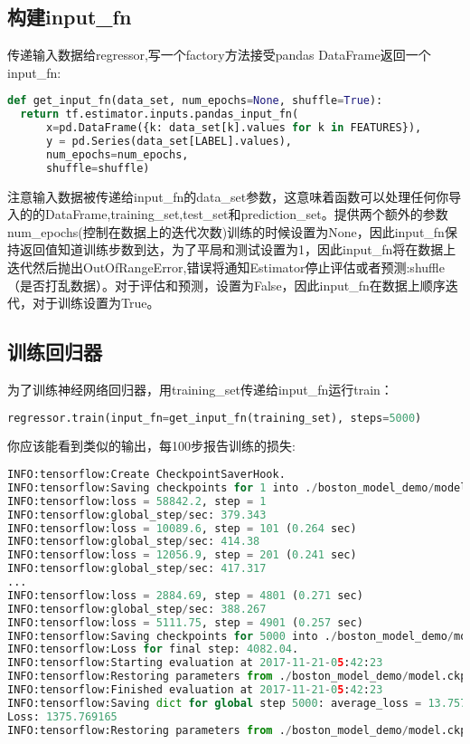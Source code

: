 \subsection{构建input\_fn}
传递输入数据给regressor,写一个factory方法接受pandas DataFrame返回一个input\_fn:
\begin{lstlisting}[language=Python]
def get_input_fn(data_set, num_epochs=None, shuffle=True):
  return tf.estimator.inputs.pandas_input_fn(
      x=pd.DataFrame({k: data_set[k].values for k in FEATURES}),
      y = pd.Series(data_set[LABEL].values),
      num_epochs=num_epochs,
      shuffle=shuffle)
\end{lstlisting}
注意输入数据被传递给input\_fn的data\_set参数，这意味着函数可以处理任何你导入的的DataFrame,training\_set,test\_set和prediction\_set。提供两个额外的参数num\_epochs(控制在数据上的迭代次数)训练的时候设置为None，因此input\_fn保持返回值知道训练步数到达，为了平局和测试设置为1，因此input\_fn将在数据上迭代然后抛出OutOfRangeError,错误将通知Estimator停止评估或者预测:shuffle（是否打乱数据）。对于评估和预测，设置为False，因此input\_fn在数据上顺序迭代，对于训练设置为True。
\subsection{训练回归器}
为了训练神经网络回归器，用training\_set传递给input\_fn运行train：
\begin{lstlisting}[language=Python]
regressor.train(input_fn=get_input_fn(training_set), steps=5000)
\end{lstlisting}
你应该能看到类似的输出，每100步报告训练的损失:
\begin{lstlisting}[language=Python]
INFO:tensorflow:Create CheckpointSaverHook.
INFO:tensorflow:Saving checkpoints for 1 into ./boston_model_demo/model.ckpt.
INFO:tensorflow:loss = 58842.2, step = 1
INFO:tensorflow:global_step/sec: 379.343
INFO:tensorflow:loss = 10089.6, step = 101 (0.264 sec)
INFO:tensorflow:global_step/sec: 414.38
INFO:tensorflow:loss = 12056.9, step = 201 (0.241 sec)
INFO:tensorflow:global_step/sec: 417.317
...
INFO:tensorflow:loss = 2884.69, step = 4801 (0.271 sec)
INFO:tensorflow:global_step/sec: 388.267
INFO:tensorflow:loss = 5111.75, step = 4901 (0.257 sec)
INFO:tensorflow:Saving checkpoints for 5000 into ./boston_model_demo/model.ckpt.
INFO:tensorflow:Loss for final step: 4082.04.
INFO:tensorflow:Starting evaluation at 2017-11-21-05:42:23
INFO:tensorflow:Restoring parameters from ./boston_model_demo/model.ckpt-5000
INFO:tensorflow:Finished evaluation at 2017-11-21-05:42:23
INFO:tensorflow:Saving dict for global step 5000: average_loss = 13.7577, global_step = 5000, loss = 1375.77
Loss: 1375.769165
INFO:tensorflow:Restoring parameters from ./boston_model_demo/model.ckpt-5000
\end{lstlisting}
